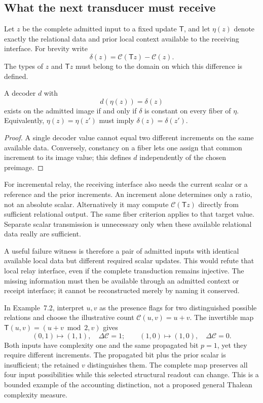 \subsection*{What the next transducer must receive}
Let $z$ be the complete admitted input to a fixed update $\mathsf T$, and let $\eta(z)$ denote exactly the relational data and prior local context available to the receiving interface. For brevity write
\[
\delta(z)=\mathcal C(\mathsf Tz)-\mathcal C(z).
\]
The types of $z$ and $\mathsf Tz$ must belong to the domain on which this difference is defined.
\begin{proposition}\label{prop:localincrement}
A decoder $d$ with
\begin{equation}
d(\eta(z))=\delta(z)
\tag{RC5}\label{eq:localincrement}
\end{equation}
exists on the admitted image if and only if $\delta$ is constant on every fiber of $\eta$. Equivalently, $\eta(z)=\eta(z')$ must imply $\delta(z)=\delta(z')$.
\end{proposition}
\begin{proof}
A single decoder value cannot equal two different increments on the same available data. Conversely, constancy on a fiber lets one assign that common increment to its image value; this defines $d$ independently of the chosen preimage.
\end{proof}
For incremental relay, the receiving interface also needs the current scalar or a reference and the prior increments. An increment alone determines only a ratio, not an absolute scalar. Alternatively it may compute $\mathcal C(\mathsf Tz)$ directly from sufficient relational output. The same fiber criterion applies to that target value. Separate scalar transmission is unnecessary only when these available relational data really are sufficient.

A useful failure witness is therefore a pair of admitted inputs with identical available local data but different required scalar updates. This would refute that local relay interface, even if the complete transduction remains injective. The missing information must then be available through an admitted context or receipt interface; it cannot be reconstructed merely by naming it conserved.

\begin{example}
In Example~7.2, interpret $u,v$ as the presence flags for two distinguished possible relations and choose the illustrative count $\mathcal C(u,v)=u+v$. The invertible map $\mathsf T(u,v)=(u+v\bmod2,v)$ gives
\[
(0,1)\longmapsto(1,1),\quad\Delta\mathcal C=1;
\qquad
(1,0)\longmapsto(1,0),\quad\Delta\mathcal C=0.
\]
Both inputs have complexity one and the same propagated bit $p=1$, yet they require different increments. The propagated bit plus the prior scalar is insufficient; the retained $v$ distinguishes them. The complete map preserves all four input possibilities while this selected structural readout can change. This is a bounded example of the accounting distinction, not a proposed general Thalean complexity measure.
\end{example}



